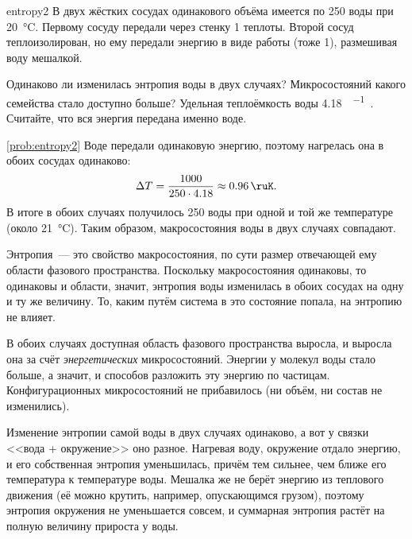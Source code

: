 \begin{problem}{}{entropy2}
    В двух жёстких сосудах одинакового объёма имеется по \qty{250}{\ruG} воды при \qty{20}{\degreeCelsius}. Первому сосуду передали через стенку \qty{1}{\ruKJ} теплоты. Второй сосуд теплоизолирован, но ему передали энергию в виде работы (тоже \qty{1}{\ruKJ}), размешивая воду мешалкой.

    Одинаково ли изменилась энтропия воды в двух случаях? Микросостояний какого семейства стало доступно больше? Удельная теплоёмкость воды \qty{4,18}{\ruJ\per\ruG\ruK}. Считайте, что вся энергия передана именно воде.
    \begin{sol}{\ref{prob:entropy2}}
        Воде передали одинаковую энергию, поэтому нагрелась она в обоих сосудах одинаково:
        \begin{equation*}
            \Delta T = \frac{\num{1000}}{\num{250} \cdot \num{4,18}} \approx \qty{0,96}{\ruK}.
        \end{equation*}
        В итоге в обоих случаях получилось \qty{250}{\ruG} воды при одной и той же температуре (около \qty{21}{\degreeCelsius}). Таким образом, макросостояния воды в двух случаях совпадают.

        Энтропия~--- это свойство макросостояния, по сути размер отвечающей ему области фазового пространства. Поскольку макросостояния одинаковы, то одинаковы и области, значит, энтропия воды изменилась в обоих сосудах на одну и ту же величину. То, каким путём система в это состояние попала, на энтропию не влияет.

        В обоих случаях доступная область фазового пространства выросла, и выросла она за счёт \emph{энергетических} микросостояний. Энергии у молекул воды стало больше, а значит, и способов разложить эту энергию по частицам. Конфигурационных микросостояний не прибавилось (ни объём, ни состав не изменились).

        Изменение энтропии самой воды в двух случаях одинаково, а вот у связки <<вода + окружение>> оно разное. Нагревая воду, окружение отдало энергию, и его собственная энтропия уменьшилась, причём тем сильнее, чем ближе его температура к температуре воды. Мешалка же не берёт энергию из теплового движения (её можно крутить, например, опускающимся грузом), поэтому энтропия окружения не уменьшается совсем, и суммарная энтропия растёт на полную величину прироста у воды.
    \end{sol}
\end{problem}


